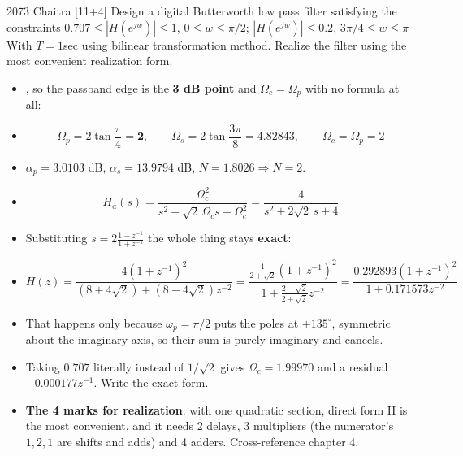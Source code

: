 \begin{asked}{2073 Chaitra \textperiodcentered{} [11+4]}
Design a digital Butterworth low pass filter satisfying the constraints
$0.707\le|H(e^{jw})|\le1$, $0\le w\le\pi/2$; $|H(e^{jw})|\le0.2$, $3\pi/4\le w\le\pi$
With $T=1$sec using bilinear transformation method. Realize the filter using the most
convenient realization form.
\end{asked}
\begin{itemize}
  \item {}, so the passband edge is the \textbf{3 dB point} and
        $\Omega_c=\Omega_p$ with no formula at all:
  \item[] \[ \Omega_p=2\tan\frac{\pi}{4}=\mathbf{2},\qquad
             \Omega_s=2\tan\frac{3\pi}{8}=4.82843,\qquad \Omega_c=\Omega_p=2 \]
  \item $\alpha_p=3.0103$ dB, $\alpha_s=13.9794$ dB, $N=1.8026\Rightarrow\boxed{N=2}$.
  \item[] \[ H_a(s)=\frac{\Omega_c^2}{s^2+\sqrt2\,\Omega_c s+\Omega_c^2}
             =\frac{4}{s^2+2\sqrt2\,s+4} \]
  \item Substituting $s=2\frac{1-z^{-1}}{1+z^{-1}}$ the whole thing stays
        \textbf{exact}:
  \item[] \[ H(z)=\frac{4(1+z^{-1})^2}{(8+4\sqrt2)+(8-4\sqrt2)z^{-2}}
             =\boxed{\frac{\tfrac{1}{2+\sqrt2}(1+z^{-1})^2}
                          {1+\tfrac{2-\sqrt2}{2+\sqrt2}z^{-2}}}
             =\frac{0.292893(1+z^{-1})^2}{1+0.171573z^{-2}} \]
  \item {} That happens only because
        $\omega_p=\pi/2$ puts the poles at $\pm135^\circ$, symmetric about the imaginary
        axis, so their sum is purely imaginary and cancels.
  \item Taking $0.707$ literally instead of $1/\sqrt2$ gives $\Omega_c=1.99970$ and a
        residual $-0.000177z^{-1}$.  Write the exact
        form.
  \item \textbf{The 4 marks for realization}: with one quadratic section, direct form II
        is the most convenient, and it needs 2 delays, 3 multipliers (the numerator's
        $1,2,1$ are shifts and adds) and 4 adders. Cross-reference chapter 4.
\end{itemize}

